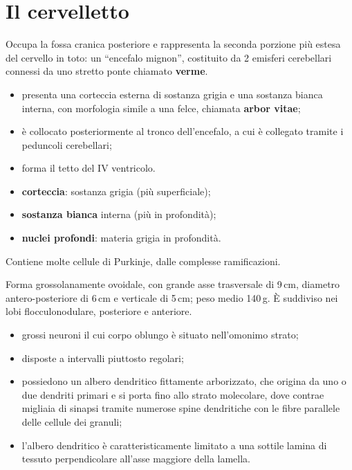 \section{Il cervelletto}

Occupa la fossa cranica posteriore e rappresenta la seconda porzione più
estesa del cervello in toto: un ``encefalo mignon'', costituito da 2 emisferi
cerebellari connessi da uno stretto ponte chiamato \textbf{verme}.

\begin{itemize}
  \item presenta una corteccia esterna di sostanza grigia e una sostanza
    bianca interna, con morfologia simile a una felce, chiamata
    \textbf{arbor vitae};
  \item è collocato posteriormente al tronco dell'encefalo, a cui è collegato
    tramite i peduncoli cerebellari;
  \item forma il tetto del IV ventricolo.
\end{itemize}

\begin{itemize}
  \item \textbf{corteccia}: sostanza grigia (più superficiale);
  \item \textbf{sostanza bianca} interna (più in profondità);
  \item \textbf{nuclei profondi}: materia grigia in profondità.
\end{itemize}

Contiene molte cellule di Purkinje, dalle complesse ramificazioni.

Forma grossolanamente ovoidale, con grande asse trasversale di 9\,cm,
diametro antero-posteriore di 6\,cm e verticale di 5\,cm; peso medio 140\,g.
È suddiviso nei lobi flocculonodulare, posteriore e anteriore.

\begin{itemize}
  \item grossi neuroni il cui corpo oblungo è situato nell'omonimo strato;
  \item disposte a intervalli piuttosto regolari;
  \item possiedono un albero dendritico fittamente arborizzato, che origina
    da uno o due dendriti primari e si porta fino allo strato molecolare,
    dove contrae migliaia di sinapsi tramite numerose spine dendritiche con
    le fibre parallele delle cellule dei granuli;
  \item l'albero dendritico è caratteristicamente limitato a una sottile
    lamina di tessuto perpendicolare all'asse maggiore della lamella.
\end{itemize}

